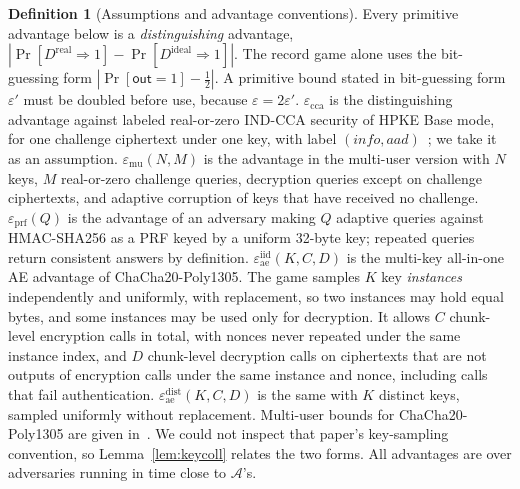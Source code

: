 \documentclass[pdflatex,sn-mathphys-num]{sn-jnl}
\theoremstyle{plain}
\theoremstyle{definition}
\newtheorem{definition}[theorem]{Definition}
\begin{document}
\begin{definition}[Assumptions and advantage conventions]\label{def:assumptions}
Every primitive advantage below is a \emph{distinguishing} advantage, $|\Pr[D^{\mathrm{real}}\Rightarrow1]-\Pr[D^{\mathrm{ideal}}\Rightarrow1]|$. The record game alone uses the bit-guessing form $|\Pr[\mathsf{out}=1]-\tfrac12|$. A primitive bound stated in bit-guessing form $\varepsilon'$ must be doubled before use, because $\varepsilon=2\varepsilon'$.
$\varepsilon_{\mathrm{cca}}$ is the distinguishing advantage against labeled real-or-zero IND-CCA security of HPKE Base mode, for one challenge ciphertext under one key, with label $(\mathit{info},\mathit{aad})$~\cite{rfc9180}; we take it as an assumption. $\varepsilon_{\mathrm{mu}}(N,M)$ is the advantage in the multi-user version with $N$ keys, $M$ real-or-zero challenge queries, decryption queries except on challenge ciphertexts, and adaptive corruption of keys that have received no challenge. $\varepsilon_{\mathrm{prf}}(Q)$ is the advantage of an adversary making $Q$ adaptive queries against HMAC-SHA256 as a PRF keyed by a uniform 32-byte key; repeated queries return consistent answers by definition. $\varepsilon^{\mathrm{iid}}_{\mathrm{ae}}(K,C,D)$ is the multi-key all-in-one AE advantage of ChaCha20-Poly1305. The game samples $K$ key \emph{instances} independently and uniformly, with replacement, so two instances may hold equal bytes, and some instances may be used only for decryption. It allows $C$ chunk-level encryption calls in total, with nonces never repeated under the same instance index, and $D$ chunk-level decryption calls on ciphertexts that are not outputs of encryption calls under the same instance and nonce, including calls that fail authentication. $\varepsilon^{\mathrm{dist}}_{\mathrm{ae}}(K,C,D)$ is the same with $K$ distinct keys, sampled uniformly without replacement. Multi-user bounds for ChaCha20-Poly1305 are given in~\cite{degabriele2021}. We could not inspect that paper's key-sampling convention, so Lemma~\ref{lem:keycoll} relates the two forms. All advantages are over adversaries running in time close to $\mathcal A$'s.
\end{definition}
\end{document}
